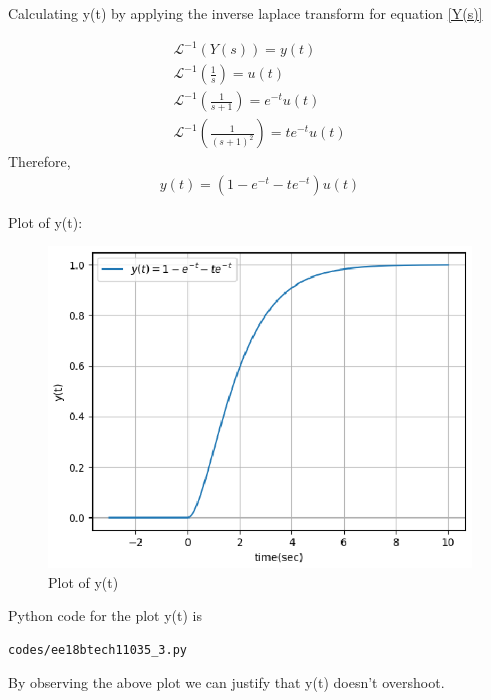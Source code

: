 \begin{enumerate}[label=\thesection.\arabic*.,ref=\thesection.\theenumi]
Calculating y(t) by applying the inverse laplace transform for equation \eqref{Y(s)}

\begin{align}
\mathscr{L}^{-1}(Y(s)) = y(t)\\
 \mathscr{L}^{-1} (\frac{1}{s}) = u(t)\\
 \mathscr{L}^{-1} (\frac{1}{s+1}) = e^{-t}u(t)\\
\mathscr{L}^{-1}(\frac{1}{(s+1)^2}) = te^{-t}u(t)
\end{align}
Therefore,
\begin{align}
y(t) = (1-e^{-t}-te^{-t})u(t)
\end{align}

Plot of y(t):\\
\begin{figure}[!h]
\includegraphics[width=\columnwidth]{./figures/ee18btech11035_3.eps}
\caption{Plot of y(t)}
\label{fig:ee18btech11035_y(t)}
\end{figure}

Python code for the plot y(t) is
\begin{lstlisting}
codes/ee18btech11035_3.py
\end{lstlisting}

By observing the above plot we can justify that y(t) doesn't overshoot.

\end{enumerate}
